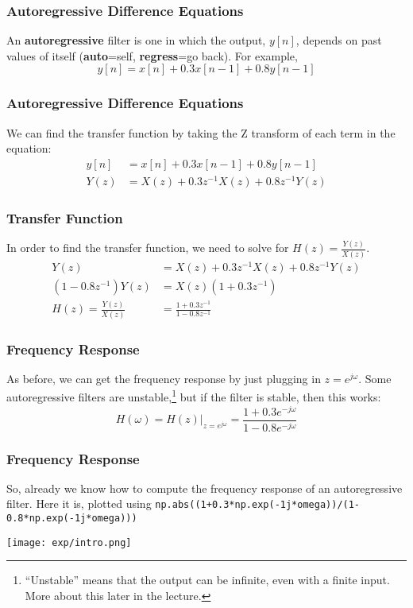 \documentclass{beamer}
\begin{document}
\begin{frame}
  \frametitle{Autoregressive Difference Equations}

  An {\bf autoregressive} filter is one in which the output, $y[n]$,
  depends on past values of itself ({\bf auto}=self, {\bf
    regress}=go back).  For example,
  \[
  y[n] = x[n] + 0.3x[n-1] + 0.8 y[n-1]
  \]
  
\end{frame}

\begin{frame}
  \frametitle{Autoregressive Difference Equations}

  We can find the transfer function by taking the Z transform of each term
  in the equation:
  \begin{align*}
    y[n] &= x[n] + 0.3 x[n-1] +  0.8 y[n-1]\\
    Y(z) &= X(z) + 0.3z^{-1}X(z) + 0.8  z^{-1}Y(z)
  \end{align*}
  
\end{frame}

\begin{frame}
  \frametitle{Transfer Function}

  In order to find the transfer function, we need to solve for
  $H(z)=\frac{Y(z)}{X(z)}$.
  \begin{align*}
    Y(z) &= X(z) + 0.3z^{-1}X(z) + 0.8 z^{-1}Y(z)\\
    \left(1-0.8z^{-1}\right)Y(z) &= X(z)(1+0.3z^{-1})\\
    H(z) =\frac{Y(z)}{X(z)} &= \frac{1+0.3z^{-1}}{1-0.8 z^{-1}}
  \end{align*}
\end{frame}

\begin{frame}
  \frametitle{Frequency Response}

  As before, we can get the frequency response by just plugging in
  $z=e^{j\omega}$.  Some autoregressive filters are
  unstable,\footnote{``Unstable'' means that the output can be
    infinite, even with a finite input.  More about this later in the
    lecture.} but if the filter is stable, then this works:
  \[
  H(\omega) = H(z)\vert_{z=e^{j\omega}} = \frac{1+0.3e^{-j\omega}}{1-0.8 e^{-j\omega}}
  \]
\end{frame}

\begin{frame}
  \frametitle{Frequency Response}

  So, already we know how to compute the frequency response of an autoregressive filter.
  Here it is, plotted using {\tt np.abs((1+0.3*np.exp(-1j*omega))/(1-0.8*np.exp(-1j*omega)))}
  
  \centerline{\texttt{[image: exp/intro.png]}}
\end{frame}
\end{document}
